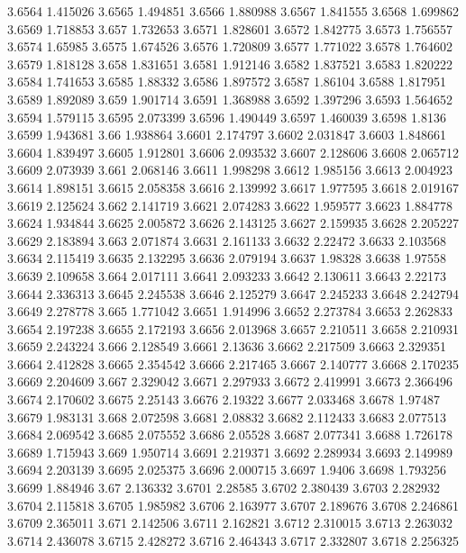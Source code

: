 3.6564  1.415026
3.6565  1.494851
3.6566  1.880988
3.6567  1.841555
3.6568  1.699862
3.6569  1.718853
3.657  1.732653
3.6571  1.828601
3.6572  1.842775
3.6573  1.756557
3.6574  1.65985
3.6575  1.674526
3.6576  1.720809
3.6577  1.771022
3.6578  1.764602
3.6579  1.818128
3.658  1.831651
3.6581  1.912146
3.6582  1.837521
3.6583  1.820222
3.6584  1.741653
3.6585  1.88332
3.6586  1.897572
3.6587  1.86104
3.6588  1.817951
3.6589  1.892089
3.659  1.901714
3.6591  1.368988
3.6592  1.397296
3.6593  1.564652
3.6594  1.579115
3.6595  2.073399
3.6596  1.490449
3.6597  1.460039
3.6598  1.8136
3.6599  1.943681
3.66  1.938864
3.6601  2.174797
3.6602  2.031847
3.6603  1.848661
3.6604  1.839497
3.6605  1.912801
3.6606  2.093532
3.6607  2.128606
3.6608  2.065712
3.6609  2.073939
3.661  2.068146
3.6611  1.998298
3.6612  1.985156
3.6613  2.004923
3.6614  1.898151
3.6615  2.058358
3.6616  2.139992
3.6617  1.977595
3.6618  2.019167
3.6619  2.125624
3.662  2.141719
3.6621  2.074283
3.6622  1.959577
3.6623  1.884778
3.6624  1.934844
3.6625  2.005872
3.6626  2.143125
3.6627  2.159935
3.6628  2.205227
3.6629  2.183894
3.663  2.071874
3.6631  2.161133
3.6632  2.22472
3.6633  2.103568
3.6634  2.115419
3.6635  2.132295
3.6636  2.079194
3.6637  1.98328
3.6638  1.97558
3.6639  2.109658
3.664  2.017111
3.6641  2.093233
3.6642  2.130611
3.6643  2.22173
3.6644  2.336313
3.6645  2.245538
3.6646  2.125279
3.6647  2.245233
3.6648  2.242794
3.6649  2.278778
3.665  1.771042
3.6651  1.914996
3.6652  2.273784
3.6653  2.262833
3.6654  2.197238
3.6655  2.172193
3.6656  2.013968
3.6657  2.210511
3.6658  2.210931
3.6659  2.243224
3.666  2.128549
3.6661  2.13636
3.6662  2.217509
3.6663  2.329351
3.6664  2.412828
3.6665  2.354542
3.6666  2.217465
3.6667  2.140777
3.6668  2.170235
3.6669  2.204609
3.667  2.329042
3.6671  2.297933
3.6672  2.419991
3.6673  2.366496
3.6674  2.170602
3.6675  2.25143
3.6676  2.19322
3.6677  2.033468
3.6678  1.97487
3.6679  1.983131
3.668  2.072598
3.6681  2.08832
3.6682  2.112433
3.6683  2.077513
3.6684  2.069542
3.6685  2.075552
3.6686  2.05528
3.6687  2.077341
3.6688  1.726178
3.6689  1.715943
3.669  1.950714
3.6691  2.219371
3.6692  2.289934
3.6693  2.149989
3.6694  2.203139
3.6695  2.025375
3.6696  2.000715
3.6697  1.9406
3.6698  1.793256
3.6699  1.884946
3.67  2.136332
3.6701  2.28585
3.6702  2.380439
3.6703  2.282932
3.6704  2.115818
3.6705  1.985982
3.6706  2.163977
3.6707  2.189676
3.6708  2.246861
3.6709  2.365011
3.671  2.142506
3.6711  2.162821
3.6712  2.310015
3.6713  2.263032
3.6714  2.436078
3.6715  2.428272
3.6716  2.464343
3.6717  2.332807
3.6718  2.256325
